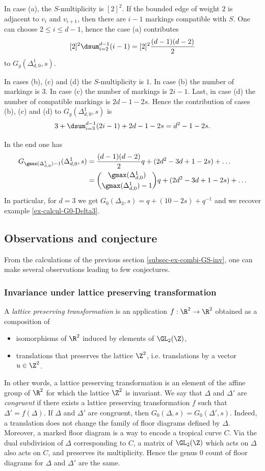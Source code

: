 \begin{exam}
	In case (a), the $S$-multiplicity is $[2]^2$. If the bounded edge of weight $2$ is adjacent to $v_i$ and $v_{i+1}$, then there are $i-1$ markings compatible with $S$. One can choose $2\leqslant i \leqslant d-1$, hence the case (a) contributes
	\[ [2]^2 \dsum_{i=2}^{d-1} (i-1) = [2]^2 \dfrac{(d-1)(d-2)}{2} \]
	to $G_g(\Delta^1_{d,0},s)$.
	
	In cases (b), (c) and (d) the $S$-multiplicity is $1$. In case (b) the number of markings is $3$. In case (c) the number of markings is $2i-1$. Last, in case (d) the number of compatible markings is $2d-1-2s$. Hence the contribution of cases (b), (c) and (d) to $G_g(\Delta^1_{d,0},s)$ is
	\[ 3 + \dsum_{i=3}^{d-1}(2i-1) + 2d-1-2s = d^2-1-2s .\]
	
	In the end one has
	\begin{align*}
	G_{\gmax(\Delta^1_{d,0})-1}(\Delta^1_{d,0},s)
	  &= \dfrac{(d-1)(d-2)}{2} q + (2d^2-3d+1-2s) + \dots \\
	  &= \binom{\gmax(\Delta^1_{d,0})}{\gmax(\Delta^1_{d,0})-1} q + (2d^2-3d+1-2s) + \dots
	\end{align*}	
In particular, for $d=3$ we get $G_0(\Delta_3,s) = q + (10-2s) + q^{-1}$ and we recover example \ref{ex-calcul-G0-Delta3}.	
\end{exam}

\subsection{Observations and conjecture}

From the calculations of the previous section \ref{subsec-ex-combi-GS-inv}, one can make several observations leading to few conjectures.

\subsubsection{Invariance under lattice preserving transformation}



A \emph{lattice preserving transformation} is an application $f : \R^2 \to \R^2$ obtained as a composition of
\begin{itemize}
    \item isomorphisms of $\R^2$ induced by elements of $\GL_2(\Z)$,
    \item translations that preserves the lattice $\Z^2$, i.e.  translations by a vector $u\in\Z^2$.
\end{itemize} 
In other words, a lattice preserving transformation is an element of the affine group of $\R^2$ for which the lattice $\Z^2$ is invariant.  
We say that  $\Delta$ and $\Delta'$ are \emph{congruent} if there exists a lattice preserving transformation $f$ such that $\Delta' = f(\Delta)$. If $\Delta$ and $\Delta'$ are congruent, then $G_0(\Delta,s) = G_0(\Delta',s)$.
Indeed, a translation does not change the family of floor diagrams defined by $\Delta$. Moreover, a marked floor diagram is a way to encode a tropical curve $C$. Via the dual subdivision of $\Delta$ corresponding to $C$, a matrix of $\GL_2(\Z)$ which acts on $\Delta$ also acts on $C$, and preserves its multiplicity. Hence the genus $0$ count of floor diagrams for $\Delta$ and $\Delta'$ are the same.

